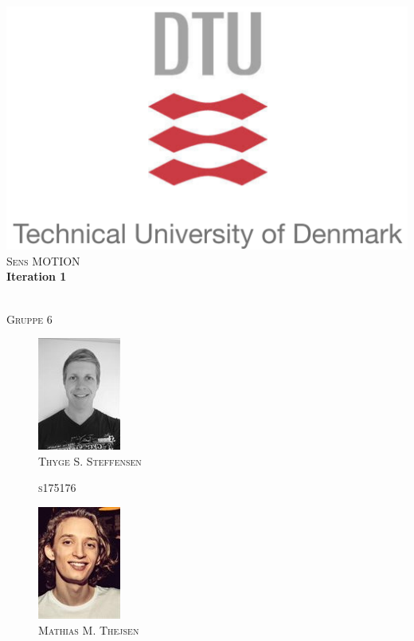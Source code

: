 \begin{titlepage}
\begin{center}

\includegraphics{dtu-logo.png}\\[0.5cm]
\textsc{\Large Sens MOTION } \\%

\HRule 
{ \huge \bfseries Iteration 1 \\[0.1cm] } %

\HRule \\[0.8cm]
\textsc{Gruppe 6}
\begin{multicols}{4}
\columnbreak
    \begin{figure}[H]
        \centering
        \includegraphics[scale=0.6]{Thyge.png}\\
        \textsc{Thyge S. Steffensen}
        
        \textsc{s175176}\\
        \hfill \break
        \hfill \break
    \end{figure}
\columnbreak
    \begin{figure}[H]
        \centering
        \includegraphics[scale=0.8]{mathias.png}\\
        \textsc{Mathias M. Thejsen}
        

\end{figure}
\end{multicols}
\end{center}
\end{titlepage}
